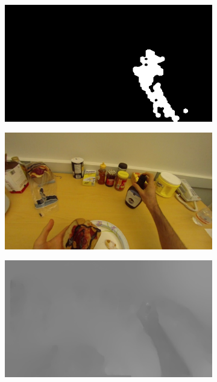 \documentclass[10pt,twocolumn,hidelinks,letterpaper]{article}
\begin{document}
\begin{figure}
\begin{subfigure}{.24\linewidth}
  \end{subfigure}
  \begin{subfigure}{.24\linewidth}
  	\includegraphics[width=\linewidth]{images/img_comp/map0001.png}
  \end{subfigure}
  \begin{subfigure}{.24\linewidth}
  	\includegraphics[width=\linewidth]{images/img_comp/rgb0011.png}
  \end{subfigure}
  \begin{subfigure}{.24\linewidth}
  	\includegraphics[width=\linewidth]{images/img_comp/flow_x_00011.png}

\end{subfigure}
\end{figure}
\end{document}
